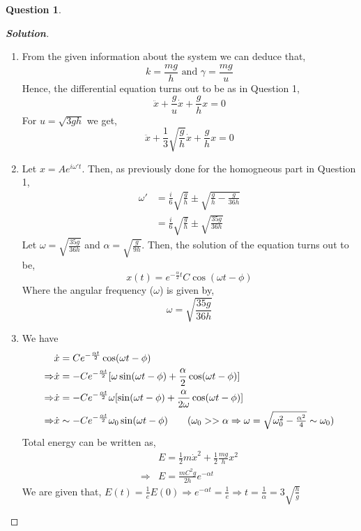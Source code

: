 \documentclass[10pt]{scrartcl}
\theoremstyle{definition}
\newtheorem{exercise}{Question}
\newenvironment{solution} {\begin{proof}[\normalfont \textbf{Solution}]} {\end{proof}}
\begin{document}
\begin{exercise}
    \begin{solution}
        $ $
        \begin{enumerate}[label={(\alph*)}]
            \item From the given information about the system we can deduce that, 
                $$k = \frac{mg}{h} \text{ and } \gamma = \frac{mg}{u}$$
                Hence, the differential equation turns out to be as in Question 1, 
                $$\ddot{x} + \frac{g}{u}\dot{x} + \frac{g}{h} x = 0$$
                For $u = \sqrt{3gh}$ we get,
                $$\ddot{x} + \frac{1}{3}\sqrt{\frac{g}{h}}\dot{x} + \frac{g}{h} x = 0$$
            \item Let $x = Ae^{i\omega' t}$. Then, as previously done for the homogneous part in Question 1, 
                \begin{align*}
                    \omega' &= \frac{i}{6}\sqrt{\frac{g}{h}} \pm \sqrt{\frac{g}{h} - \frac{g}{36h}} \\ 
                            &= \frac{i}{6}\sqrt{\frac{g}{h}} \pm \sqrt{\frac{35g}{36h}}
                \end{align*}
                Let $\omega = \sqrt{\frac{35g}{36h}}$ and $\alpha = \sqrt{\frac{g}{9h}}$. Then, the solution of the equation turns out to be, 
                $$\boxed{x(t) = e^{-\frac{\alpha}{2} t}C\cos (\omega t - \phi)}$$
                Where the angular frequency ($\omega$) is given by, 
                $$\boxed{\omega = \sqrt{\frac{35g}{36h}}}$$
            \item We have 
                \begin{align*}
                    &\dot{x} = Ce^{-\frac{\alpha t}{2}}\cos(\omega t - \phi) \\ 
                    \Rightarrow &\dot{x} = -Ce^{-\frac{\alpha t}{2}}[\omega\sin(\omega t - \phi) + \frac{\alpha}{2}\cos(\omega t - \phi)] \\ 
                    \Rightarrow &\dot{x} = -Ce^{-\frac{\alpha t}{2}}\omega[\sin(\omega t - \phi) + \frac{\alpha}{2\omega}\cos(\omega t - \phi)] \\ 
                    \Rightarrow &\dot{x} \sim -Ce^{-\frac{\alpha t}{2}}\omega_0\sin(\omega t - \phi) \tag{$\omega_0 >> \alpha \Rightarrow \omega = \sqrt{\omega_0^2 - \frac{\alpha^2}{4}} \sim \omega_0$} 
                \end{align*}
                Total energy can be written as, 
                \begin{align*}
                    &E = \frac{1}{2}m\dot{x}^2 + \frac{1}{2}\frac{mg}{h}x^2 \\ 
                    \Rightarrow &E = \frac{mC^2g}{2h}e^{-\alpha t}
                \end{align*}
                We are given that, $E(t) = \frac{1}{e}E(0) \Rightarrow e^{-\alpha t} = \frac{1}{e} \Rightarrow t = \frac{1}{\alpha} = 3\sqrt{\frac{h}{g}}$


\end{enumerate}
\end{solution}
\end{exercise}
\end{document}
